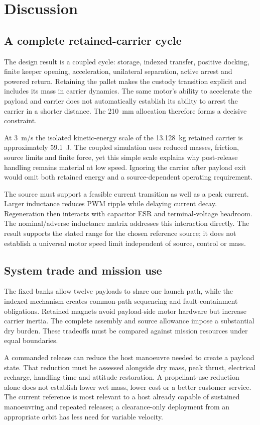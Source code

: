 \documentclass[conference,a4paper]{IEEEtran}
\begin{document}
\section{Discussion}
\subsection{A complete retained-carrier cycle}
The design result is a coupled cycle: storage, indexed transfer, positive docking, finite keeper opening, acceleration, unilateral separation, active arrest and powered return. Retaining the pallet makes the custody transition explicit and includes its mass in carrier dynamics. The same motor's ability to accelerate the payload and carrier does not automatically establish its ability to arrest the carrier in a shorter distance. The 210~mm allocation therefore forms a decisive constraint.

At 3~m/s the isolated kinetic-energy scale of the 13.128~kg retained carrier is approximately 59.1~J. The coupled simulation uses reduced masses, friction, source limits and finite force, yet this simple scale explains why post-release handling remains material at low speed. Ignoring the carrier after payload exit would omit both retained energy and a source-dependent operating requirement.

The source must support a feasible current transition as well as a peak current. Larger inductance reduces PWM ripple while delaying current decay. Regeneration then interacts with capacitor ESR and terminal-voltage headroom. The nominal/adverse inductance matrix addresses this interaction directly. The result supports the stated range for the chosen reference source; it does not establish a universal motor speed limit independent of source, control or mass.

\subsection{System trade and mission use}
The fixed banks allow twelve payloads to share one launch path, while the indexed mechanism creates common-path sequencing and fault-containment obligations. Retained magnets avoid payload-side motor hardware but increase carrier inertia. The complete assembly and source allowance impose a substantial dry burden. These tradeoffs must be compared against mission resources under equal boundaries.

A commanded release can reduce the host manoeuvre needed to create a payload state. That reduction must be assessed alongside dry mass, peak thrust, electrical recharge, handling time and attitude restoration. A propellant-use reduction alone does not establish lower wet mass, lower cost or a better customer service. The current reference is most relevant to a host already capable of sustained manoeuvring and repeated releases; a clearance-only deployment from an appropriate orbit has less need for variable velocity.
\end{document}
